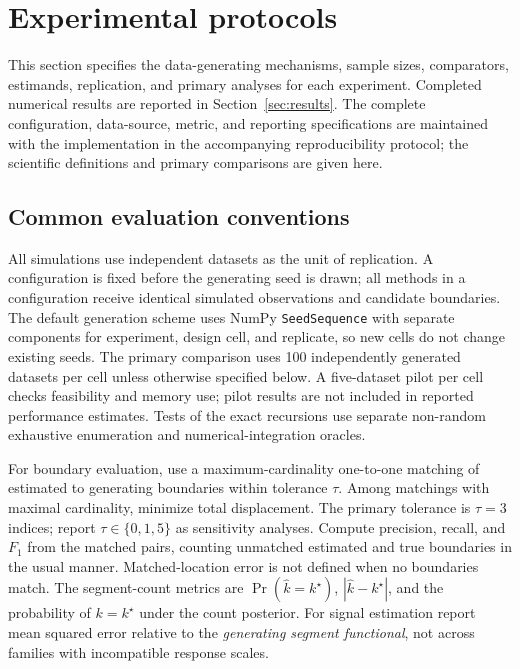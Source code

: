 \section{Experimental protocols}
\label{sec:experimental-design}

This section specifies the data-generating mechanisms, sample sizes,
comparators, estimands, replication, and primary analyses for each experiment.
Completed numerical results are reported in Section~\ref{sec:results}.
The complete configuration, data-source, metric, and reporting specifications are
maintained with the implementation in the accompanying reproducibility
protocol; the scientific definitions and primary comparisons are given here.

\subsection{Common evaluation conventions}
\label{subsec:evaluation-conventions}
All simulations use independent datasets as the unit of replication. A
configuration is fixed before the generating seed is drawn; all methods in a
configuration receive identical simulated observations and candidate boundaries.
The default generation scheme uses NumPy \texttt{SeedSequence} with separate
components for experiment, design cell, and replicate, so new cells do not
change existing seeds. The primary comparison uses 100 independently generated
datasets per cell unless otherwise specified below. A five-dataset pilot per
cell checks feasibility and memory use; pilot results are not included in
reported performance estimates. Tests of the exact recursions use separate
non-random exhaustive enumeration and numerical-integration oracles.

For boundary evaluation, use a maximum-cardinality one-to-one matching of
estimated to generating boundaries within tolerance $\tau$. Among matchings
with maximal cardinality, minimize total displacement. The primary tolerance
is $\tau=3$ indices; report $\tau\in\{0,1,5\}$ as sensitivity analyses.
Compute precision, recall, and $F_1$ from the matched pairs, counting unmatched
estimated and true boundaries in the usual manner. Matched-location error is
not defined when no boundaries match. The segment-count metrics are
$\Pr(\widehat k=k^\star)$, $|\widehat k-k^\star|$, and the probability of
$k=k^\star$ under the count posterior. For signal estimation report mean
squared error relative to the \emph{generating segment functional}, not across
families with incompatible response scales.

